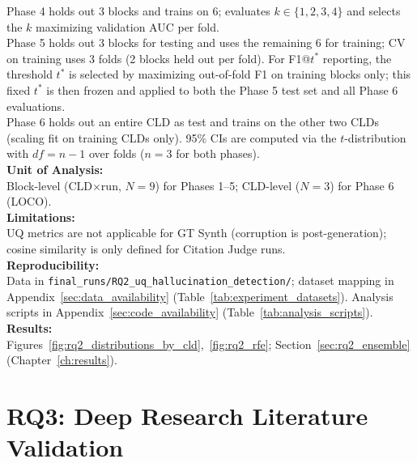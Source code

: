 Phase 4 holds out 3 blocks and trains on 6; evaluates \(k \in \{1,2,3,4\}\) and selects the \(k\) maximizing validation AUC per fold.\\
Phase 5 holds out 3 blocks for testing and uses the remaining 6 for training; CV on training uses 3 folds (2 blocks held out per fold). For F1@$t^*$ reporting, the threshold $t^*$ is selected by maximizing out-of-fold F1 on training blocks only; this fixed $t^*$ is then frozen and applied to both the Phase 5 test set and all Phase 6 evaluations.\\
Phase 6 holds out an entire CLD as test and trains on the other two CLDs (scaling fit on training CLDs only). 95\% CIs are computed via the $t$-distribution with $df=n-1$ over folds ($n=3$ for both phases).\\
\textbf{Unit of Analysis:}\\
Block-level (CLD$\times$run, $N=9$) for Phases 1--5; CLD-level ($N=3$) for Phase 6 (LOCO).\\
\textbf{Limitations:}\\
UQ metrics are not applicable for GT Synth (corruption is post-generation); cosine similarity is only defined for Citation Judge runs.\\
\textbf{Reproducibility:}\\
Data in \texttt{final\_runs/RQ2\_uq\_hallucination\_detection/}; dataset mapping in Appendix~\ref{sec:data_availability} (Table~\ref{tab:experiment_datasets}). Analysis scripts in Appendix~\ref{sec:code_availability} (Table~\ref{tab:analysis_scripts}).\\
\textbf{Results:}\\
Figures~\ref{fig:rq2_distributions_by_cld},~\ref{fig:rq2_rfe}; Section~\ref{sec:rq2_ensemble} (Chapter~\ref{ch:results}).
    
\section{RQ3: Deep Research Literature Validation}
\label{sec:rq3_experiments}

\begin{center}
\end{center}

